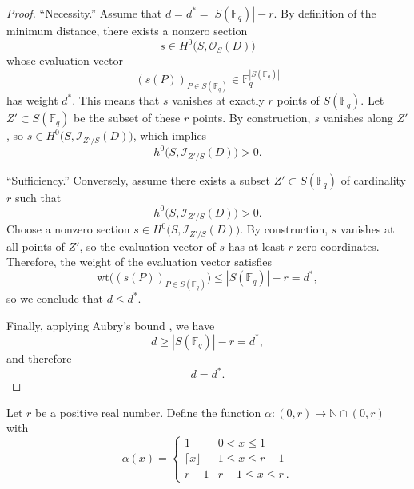 \documentclass[14pt]{amsart}
\theoremstyle{plain}
\theoremstyle{definition}
\theoremstyle{remark}
\theoremstyle{example}
\def \N{\mathbb{N}}
\begin{document}
\begin{proof}
``Necessity.''
Assume that $d = d^* = |S(\mathbb{F}_q)| - r$. By definition of the minimum distance, there exists a nonzero section 
\[
s \in H^0\big(S, \mathcal{O}_S(D)\big)
\] 
whose evaluation vector
\[
(s(P))_{P \in S(\mathbb{F}_q)} \in \mathbb{F}_q^{|S(\mathbb{F}_q)|}
\] 
has weight $d^*$. This means that $s$ vanishes at exactly $r$ points of $S(\mathbb{F}_q)$. Let $Z' \subset S(\mathbb{F}_q)$ be the subset of these $r$ points. By construction, $s$ vanishes along $Z'$, so $s \in H^0\big(S, \mathcal{I}_{Z'/S}(D)\big)$, which implies
\[
h^0\big(S, \mathcal{I}_{Z'/S}(D)\big) > 0.
\]

``Sufficiency.''
Conversely, assume there exists a subset $Z' \subset S(\mathbb{F}_q)$ of cardinality $r$ such that 
\[
h^0\big(S, \mathcal{I}_{Z'/S}(D)\big) > 0.
\] 
Choose a nonzero section $s \in H^0\big(S, \mathcal{I}_{Z'/S}(D)\big)$. By construction, $s$ vanishes at all points of $Z'$, so the evaluation vector of $s$ has at least $r$ zero coordinates. Therefore, the weight of the evaluation vector satisfies
\[
\mathrm{wt}\big((s(P))_{P \in S(\mathbb{F}_q)}\big) \le |S(\mathbb{F}_q)| - r = d^*,
\]
so we conclude that $d \le d^*$.

Finally, applying Aubry's bound \cite[Proposition 3.1(ii)]{Au}, we have
\[
d \ge |S(\mathbb{F}_q)| - r = d^*,
\]
and therefore
\[
d = d^*.
\]
\end{proof}

Let $r$ be a positive real number. Define the function $\alpha:(0,r)\to\N\cap (0,r)$ with 
$$
\alpha(x)= \left\{
\begin{array}{rl}
	1&	0<x\leq 1	\\
	\lceil x\rfloor&	1\leq x\leq r-1 \\
	r-1&	r-1\leq x\leq r\ .
\end{array} \right.
$$
\end{document}
